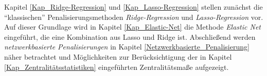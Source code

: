 \documentclass[12pt, a4paper]{report}\usepackage[]{graphicx}\usepackage[]{color}
\begin{document}
Kapitel \ref{Kap_Ridge-Regression} und \ref{Kap_Lasso-Regression} stellen zunächst die "`klassischen"' Penalisierungsmethoden \textit{Ridge-Regression} und \textit{Lasso-Regression} vor. Auf dieser Grundlage wird in Kapitel \ref{Kap_Elastic-Net} die Methode \textit{Elastic Net} eingeführt, die eine Kombination aus Lasso und Ridge ist. Abschließend werden \textit{netzwerkbasierte Penalisierungen} in Kapitel \ref{Netzwerkbasierte_Penalisierung} näher betrachtet und Möglichkeiten zur Berücksichtigung der in Kapitel \ref{Kap_Zentralitätsstatistiken} eingeführten Zentralitätsmaße aufgezeigt.
\begin{comment}
Unverzerrtheit des $\hat{\beta}$ der Kleinste-Quadratmethode wird geopfert, um den \textit{mittleren quadratischen Fehler} (englisch: mean squared error; \textit{MSE}) zu senken\\
Ridge wird eingeführt, weil Teil von Elastic Net\\
kein Intercept (bei allen Penalisierungen?); durch Standardisierung bzw. Zentralisierung fällt $\beta_0$ weg \cite{montgomery2012introduction}\\
warum keine Subsetselection\\
hat penalisierung, auch die netzwerkbasierte, was baysianisches?\\
!!\\
LAGARGIAN MULTIPLIER?????\\
penalized bestraft größere Beta mehr - intercept raus, weil sonst bestrafung nicht unabhängig von der skala des outcomes wäre!!! (für allgemeine einführung: http://web.as.uky.edu/statistics/users/pbreheny/764-F11/notes/8-30.pdf)
\end{comment}
\end{document}
